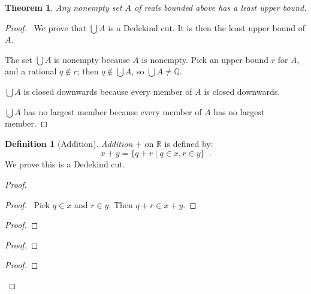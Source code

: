 \documentclass{article}
\let\qed\relax
\newtheorem{theorem}[axiom]{Theorem}
\theoremstyle{definition}
\newtheorem{definition}[axiom]{Definition}
\begin{document}
    \begin{theorem}
        Any nonempty set $A$ of reals bounded above has a least upper bound.
    \end{theorem}

    \begin{proof}
        \pf\ We prove that $\bigcup A$ is a Dedekind cut. It is then the least upper bound of $A$.

        The set $\bigcup A$ is nonempty because $A$ is nonempty. Pick an upper bound $r$ for $A$, and a
        rational $q \notin r$; then $q \notin \bigcup A$, so $\bigcup A \neq \mathbb{Q}$.

        $\bigcup A$ is closed downwards because every member of $A$ is closed downwards.

        $\bigcup A$ has no largest member because every member of $A$ has no largest member. \qed
    \end{proof}

    \begin{definition}[Addition]
        \emph{Addition} $+$ on $\mathbb{R}$ is defined by:
        \[ x + y = \{ q + r \mid q \in x, r \in y \} \enspace .\]
        We prove this is a Dedekind cut.
    \end{definition}

    \begin{proof}
        \pf
        \begin{proof}
            \pf\ Pick $q \in x$ and $r \in y$. Then $q + r \in x + y$.
        \end{proof}
        \begin{proof}
        \end{proof}
        \begin{proof}
        \end{proof}
        \begin{proof}
        \end{proof}
        \qed
    \end{proof}
\end{document}
